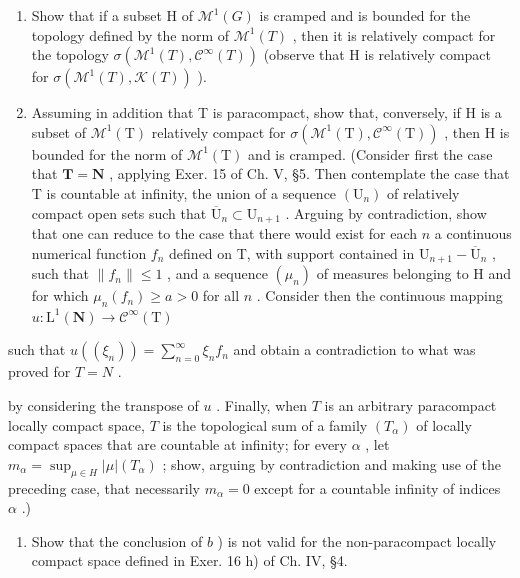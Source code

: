 \begin{enumerate}
\def\labelenumi{\alph{enumi})}
\item
  Show that if a subset H of \(\mathcal{M}^{1}(G)\) is cramped and is bounded for the topology defined by the norm of \(\mathcal{M}^{1}(T)\) , then it is relatively compact for the topology \(\sigma(\mathcal{M}^{1}(T),\mathcal{C}^{\infty}(T))\) (observe that H is relatively compact for \(\sigma(\mathcal{M}^{1}(T),\mathcal{K}(T))\) ).
\item
  Assuming in addition that T is paracompact, show that, conversely, if H is a subset of \(\mathcal{M}^1 (\mathrm{T})\) relatively compact for \(\sigma (\mathcal{M}^1 (\mathrm{T}),\mathcal{C}^\infty (\mathrm{T}))\) , then H is bounded for the norm of \(\mathcal{M}^1 (\mathrm{T})\) and is cramped. (Consider first the case that \(\mathbf{T} = \mathbf{N}\) , applying Exer. 15 of Ch. V, §5. Then contemplate the case that T is countable at infinity, the union of a sequence \((\mathrm{U}_n)\) of relatively compact open sets such that \(\overline{\mathrm{U}}_n\subset \mathrm{U}_{n + 1}\) . Arguing by contradiction, show that one can reduce to the case that there would exist for each \(n\) a continuous numerical function \(f_{n}\) defined on T, with support contained in \(\mathrm{U}_{n + 1} - \overline{\mathrm{U}}_n\) , such that \(\| f_n\| \leqslant 1\) , and a sequence \((\mu_n)\) of measures belonging to H and for which \(\mu_{n}(f_{n})\geqslant a > 0\) for all \(n\) . Consider then the continuous mapping \(u:\mathrm{L}^{1}(\mathbf{N})\to \mathcal{C}^{\infty}(\mathrm{T})\)
\end{enumerate}

such that \(u((\xi_n)) = \sum_{n=0}^{\infty} \xi_n f_n\) and obtain a contradiction to what was proved for \(T = N\) .

by considering the transpose of \(u\) . Finally, when \(T\) is an arbitrary paracompact locally compact space, \(T\) is the topological sum of a family \((T_{\alpha})\) of locally compact spaces that are countable at infinity; for every \(\alpha\) , let \(m_{\alpha} = \sup_{\mu \in H} |\mu|(T_{\alpha})\) ; show, arguing by contradiction and making use of the preceding case, that necessarily \(m_{\alpha} = 0\) except for a countable infinity of indices \(\alpha\) .)

\begin{enumerate}
\def\labelenumi{\alph{enumi})}
\setcounter{enumi}{2}
\tightlist
\item
  Show that the conclusion of \(b\) ) is not valid for the non-paracompact locally compact space defined in Exer. 16 h) of Ch. IV, §4.
\end{enumerate}

